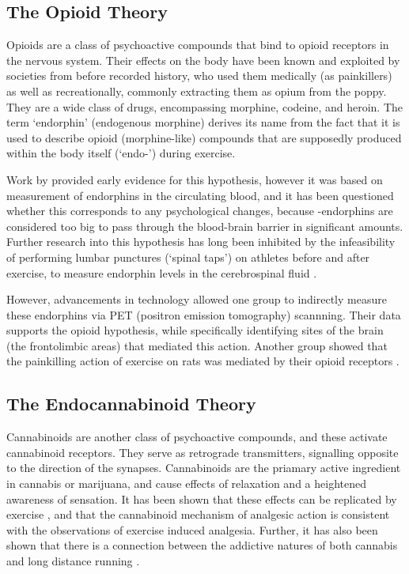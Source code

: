 \documentclass[]{article}
\begin{document}
	\subsection{The Opioid Theory}	
	Opioids are a class of psychoactive compounds that bind to opioid receptors in the nervous system. Their effects on the body have been known and exploited by societies from before recorded history, who used them medically (as painkillers) as well as recreationally, commonly extracting them as opium from the poppy. They are a wide class of drugs, encompassing morphine, codeine, and heroin. The term `endorphin' (endogenous morphine) derives its name from the fact that it is used to describe opioid (morphine-like) compounds that are supposedly produced within the body itself (`endo-') during exercise.

	Work by \citep{endorphin} provided early evidence for this hypothesis, however it was based on measurement of endorphins in the circulating blood, and it has been questioned \citep{endocan} whether this corresponds to any psychological changes, because \textbeta -endorphins are considered too big to pass through the blood-brain barrier in significant amounts. Further research into this hypothesis has long been inhibited by the infeasibility of performing lumbar punctures (`spinal taps') on athletes before and after exercise, to measure endorphin levels in the cerebrospinal fluid \citep{overview}.
	
	However, advancements in technology allowed one group \citep{opioid} to indirectly measure these endorphins via PET (positron emission tomography) scannning. Their data supports the opioid hypothesis, while specifically identifying sites of the brain (the frontolimbic areas) that mediated this action. Another group showed that the painkilling action of exercise on rats was mediated by their opioid receptors \citep{ratrun}.
	
	\subsection{The Endocannabinoid Theory}
	
	Cannabinoids are another class of psychoactive compounds, and these activate cannabinoid receptors. They serve as retrograde transmitters, signalling opposite to the direction of the synapses. Cannabinoids are the priamary active ingredient in cannabis or marijuana, and cause effects of relaxation and a heightened awareness of sensation.
	It has been shown that these effects can be replicated by exercise \citep{endocan}, and that the cannabinoid mechanism of analgesic action is consistent with the observations of exercise induced analgesia. Further, it has also been shown that there is a connection between the addictive natures of both cannabis and long distance running \citep{endocan}.
	
\end{document}

